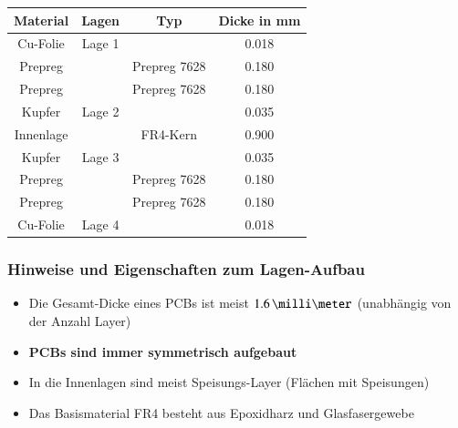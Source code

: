 \renewcommand*{\arraystretch}{1}
\begin{center}
    \begin{tabular}{|c|c|c|c|} 
        \toprule
        \textbf{Material}       & \textbf{Lagen}    & \textbf{Typ}      & \textbf{Dicke in mm}      \\
        \midrule
        Cu-Folie                & Lage 1            &                   & 0.018                     \\
        \midrule
        Prepreg                 &                   & Prepreg 7628      & 0.180                     \\
        \midrule
        Prepreg                 &                   & Prepreg 7628      & 0.180                     \\
        \midrule
        Kupfer                  & Lage 2            &                   & 0.035                     \\
        \midrule
        Innenlage               &                   & FR4-Kern          & 0.900                     \\
        \midrule
        Kupfer                  & Lage 3            &                   & 0.035                     \\
        \midrule
        Prepreg                 &                   & Prepreg 7628      & 0.180                     \\
        \midrule
        Prepreg                 &                   & Prepreg 7628      & 0.180                     \\
        \midrule
        Cu-Folie                & Lage 4            &                   & 0.018                     \\
        \midrule
    \end{tabular}
\end{center}


\subsubsection*{Hinweise und Eigenschaften zum Lagen-Aufbau}

\begin{itemize}
    \item Die Gesamt-Dicke eines PCBs ist meist $1.6 \, \milli \meter$ (unabhängig von der Anzahl Layer)
    \item \textbf{PCBs sind immer symmetrisch aufgebaut}
    \item In die Innenlagen sind meist Speisungs-Layer (Flächen mit Speisungen)
    \item Das Basismaterial FR4 besteht aus Epoxidharz und Glasfasergewebe
\end{itemize}


